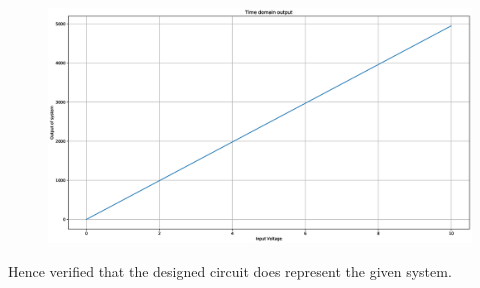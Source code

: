 \begin{enumerate}[label=\arabic*.,ref=\theenumi]
\begin{figure}[!ht]
\centering
\includegraphics[width=\columnwidth]{./figs/ee18btech11006/ee18btech11006_9.eps}
\caption{}
\label{fig:ee18btech11006_9}
\end{figure}
Hence verified that the designed circuit does represent the given system.
\end{enumerate}

